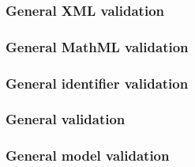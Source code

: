 \subsubsection*{General XML validation} \begin{sbmlenum}


\end{sbmlenum} \subsubsection*{General MathML validation} \begin{sbmlenum}








\end{sbmlenum} \subsubsection*{General identifier validation}  \begin{sbmlenum}


\end{sbmlenum} \subsubsection*{General  validation} \begin{sbmlenum}


\end{sbmlenum} \subsubsection*{General model validation} \begin{sbmlenum}


\end{sbmlenum}
